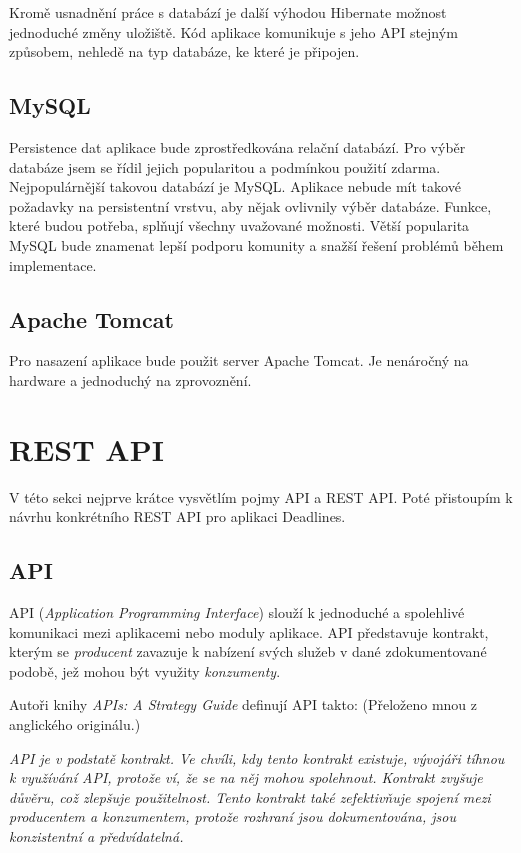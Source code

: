 \documentclass[thesis=B,czech]{FITthesis}[2012/06/26]
\begin{document}
			Kromě usnadnění práce s databází je další výhodou Hibernate možnost jednoduché změny uložiště. Kód aplikace komunikuje s jeho API stejným způsobem, nehledě na typ databáze, ke které je připojen.
		
		\subsection{MySQL}
			Persistence dat aplikace bude zprostředkována relační databází. Pro výběr databáze jsem se řídil jejich popularitou a podmínkou použití zdarma. Nejpopulárnější takovou databází je MySQL. \cite{db-ranking} Aplikace nebude mít takové požadavky na persistentní vrstvu, aby nějak ovlivnily výběr databáze. Funkce, které budou potřeba, splňují všechny uvažované možnosti. Větší popularita MySQL bude znamenat lepší podporu komunity a snažší řešení problémů během implementace.
			
		\subsection{Apache Tomcat}
			Pro nasazení aplikace bude použit server Apache Tomcat. \cite{tomcat} Je nenáročný na hardware a jednoduchý na zprovoznění. 
		
	
	\section{REST API}
		V této sekci nejprve krátce vysvětlím pojmy API a REST API. Poté přistoupím k návrhu konkrétního REST API pro aplikaci Deadlines.
	
		\subsection{API}
			API (\textit{Application Programming Interface}) slouží k jednoduché a spolehlivé komunikaci mezi aplikacemi nebo moduly aplikace. API představuje kontrakt, kterým se \textit{producent} zavazuje k nabízení svých služeb v dané zdokumentované podobě, jež mohou být využity \textit{konzumenty}.
			
			Autoři knihy \textit{APIs: A Strategy Guide} \cite{apis-a-strategy-guide} definují API takto: (Přeloženo mnou z anglického originálu.)
			
			\textit{API je v podstatě kontrakt. Ve chvíli, kdy tento kontrakt existuje, vývojáři tíhnou k využívání API, protože ví, že se na něj mohou spolehnout. Kontrakt zvyšuje důvěru, což zlepšuje použitelnost. Tento kontrakt také zefektivňuje spojení mezi producentem a konzumentem, protože rozhraní jsou dokumentována, jsou konzistentní a předvídatelná.} 
	
\end{document}
